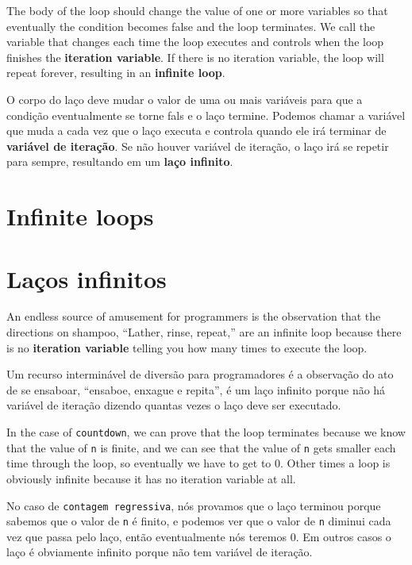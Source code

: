 
The body of the loop should change the value of one or more variables
so that eventually the condition becomes false and the loop
terminates.  
We call the variable that changes each time the loop
executes and controls when the loop finishes the 
{\bf iteration variable}.
If there is no iteration variable, the loop will repeat forever, 
resulting in an {\bf infinite loop}.  

O corpo do laço deve mudar o valor de uma ou mais variáveis para que a
condição eventualmente se torne fals e o laço termine. Podemos chamar a
variável que muda a cada vez que o laço executa e controla quando ele irá
terminar de {\bf variável de iteração}. Se não houver variável de iteração,
o laço irá se repetir para sempre, resultando em um {\bf laço infinito}.

\section{Infinite loops}
\section{Laços infinitos}

An endless source of amusement for 
programmers is the observation that the directions on shampoo,
``Lather, rinse, repeat,'' are an infinite loop because 
there is no {\bf iteration variable} telling you how many times
to execute the loop.

Um recurso interminável de diversão para programadores é a observação do ato
de se ensaboar, ``ensaboe, enxague e repita'', é um laço infinito porque não
há variável de iteração dizendo quantas vezes o laço deve ser executado.


In the case of {\tt countdown}, we can prove that the loop
terminates because we know that the value of {\tt n} is finite, and we
can see that the value of {\tt n} gets smaller each time through the
loop, so eventually we have to get to 0.  Other times a loop is obviously
infinite because it has no iteration variable at all.

No caso de {\tt contagem regressiva}, nós provamos que o laço terminou porque
sabemos que o valor de {\tt n} é finito, e podemos ver que o valor de {\tt n}
diminui cada vez que passa pelo laço, então eventualmente nós teremos 0. Em
outros casos o laço é obviamente infinito porque não tem variável de iteração.

